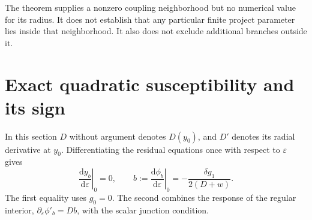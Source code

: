 \documentclass[11pt]{article}
\newcommand{\dd}{\mathrm{d}}
\newcommand{\eps}{\varepsilon}
\begin{document}
The theorem supplies a nonzero coupling neighborhood but no numerical value for its radius. It does not establish that any particular finite project parameter lies inside that neighborhood. It also does not exclude additional branches outside it.

\section{Exact quadratic susceptibility and its sign}
In this section $D$ without argument denotes $D(y_0)$, and $D'$ denotes its radial derivative at $y_0$. Differentiating the residual equations once with respect to $\eps$ gives
\begin{equation}
\left.\frac{\dd y_b}{\dd\eps}\right|_0=0,
\qquad
b:=\left.\frac{\dd\phi_b}{\dd\eps}\right|_0
=-\frac{\delta g_1}{2(D+w)}.\label{eq:firstvariation}
\end{equation}
The first equality uses $g_0=0$. The second combines the response of the regular interior, $\partial_\eps\phi'_b=Db$, with the scalar junction condition.
\end{document}
